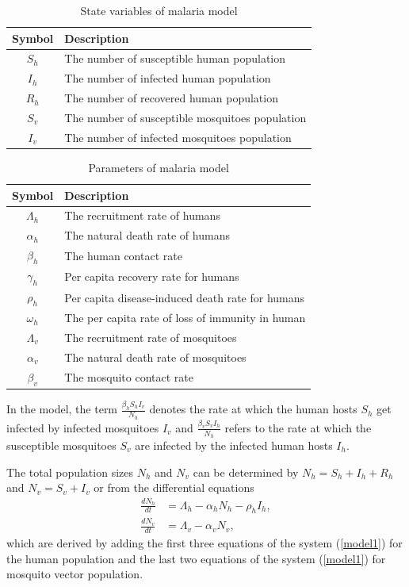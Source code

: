 \documentclass[review]{elsarticle}
\begin{document}
\begin{table}[htb!]
\centering
\caption{State variables of malaria model}
\label{table:1}
\begin{tabular}{c l}
 \hline
 Symbol & Description   \\
 \hline
 $S_h$ & The number of susceptible human population  \\
 $I_h$ & The number of infected human population  \\
 $R_h$ & The number of recovered human population \\
 $S_v$ & The number of susceptible mosquitoes population \\
 $I_v$ & The number of infected mosquitoes population \\
 \hline
\end{tabular}
\end{table}
\begin{table}[htb!]
\centering
\caption{Parameters of malaria model}\label{table:2}
\begin{tabular}{ c l }
 \hline
 Symbol & Description   \\
 \hline
 $\Lambda_h$ & The recruitment rate of humans \\
 $\alpha_h$ & The natural death rate of humans  \\
 $\beta_h$ & The human contact rate \\
 $\gamma_h$ & Per capita recovery rate for humans \\
 $\rho_h$ & Per capita disease-induced death rate for humans\\
 $\omega_h$ & The per capita rate of loss of immunity in human \\
 $\Lambda_v$ & The recruitment rate of mosquitoes  \\
 $\alpha_v$ & The natural death rate of mosquitoes  \\
 $\beta_v$ & The mosquito contact rate \\
 \hline
\end{tabular}
\end{table}

In the model, the term $ \frac{\beta_h S_hI_v}{N_h}$ denotes the rate at which the human hosts $S_h$ get infected by infected mosquitoes $I_v$ and $\frac{\beta_v S_vI_h}{N_h}$ refers to the rate at which the susceptible mosquitoes $S_v$ are infected by the infected human hosts $I_h$.

\medskip

The total population sizes $N_h$ and $N_v$ can be determined by $N_h=S_h +I_h +R_h$ and $N_v=S_v +I_v $ or from
the differential equations
\begin{align}
\frac{dN_h}{dt}&=\Lambda_h-\alpha_hN_h-\rho_h I_h,\label{totalh}\\
\frac{dN_v}{dt}&=\Lambda_v-\alpha_vN_v,\label{totalv}
\end{align}
which are derived by adding the first three equations of the system (\ref{model1}) for the human population and the
last two equations of the system (\ref{model1}) for mosquito vector population.
\end{document}
